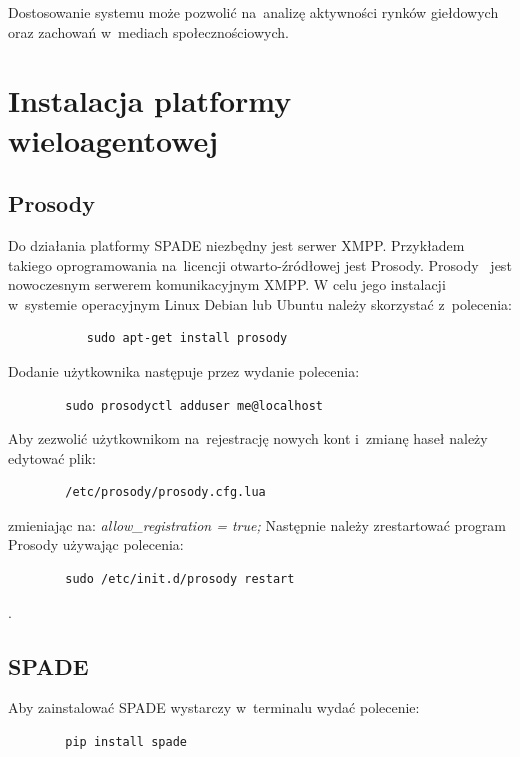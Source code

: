 \documentclass[11pt]{report}
\begin{document}
    Dostosowanie systemu może pozwolić na~analizę aktywności rynków giełdowych oraz zachowań w~mediach społecznościowych.


    \newpage
    \printbibliography[title={Bibliografia}]

    \appendix
    \newpage


    \chapter{Instalacja platformy wieloagentowej}


    \section{Prosody}
    Do działania platformy SPADE niezbędny jest serwer XMPP\@.
    Przykładem takiego oprogramowania na~licencji otwarto-źródłowej jest Prosody.
    Prosody~\cite{prosody} jest nowoczesnym serwerem komunikacyjnym XMPP\@.
    W celu jego instalacji w~systemie operacyjnym Linux Debian lub Ubuntu należy skorzystać z~polecenia:
    \begin{verbatim}
           sudo apt-get install prosody
    \end{verbatim}

    Dodanie użytkownika następuje przez wydanie polecenia:
    \begin{verbatim}
        sudo prosodyctl adduser me@localhost
    \end{verbatim}

    Aby zezwolić użytkownikom na~rejestrację nowych kont i~zmianę haseł należy edytować plik:
    \begin{verbatim}
        /etc/prosody/prosody.cfg.lua
    \end{verbatim}
    zmieniając na: \textit{allow\_registration = true;}
    Następnie należy zrestartować program Prosody używając polecenia:
    \begin{verbatim}
        sudo /etc/init.d/prosody restart
    \end{verbatim}.


    \section{SPADE}

    Aby zainstalować SPADE wystarczy w~terminalu wydać polecenie:
    \begin{verbatim}
        pip install spade
    \end{verbatim}
\end{document}
